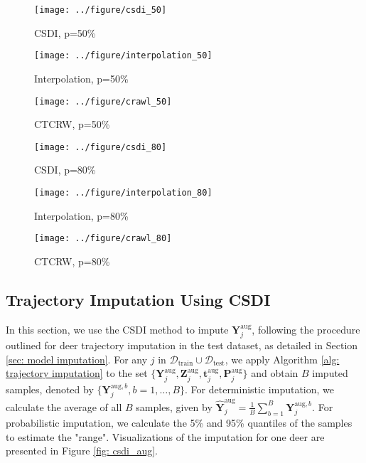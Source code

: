 \documentclass[11pt]{article}
\begin{document}
\begin{figure}[h]
  \centering
  \texttt{[image: ../figure/csdi\_50]} %
  \caption{CSDI, p=50\%}
  \label{fig: csdi_50} %
\end{figure}

\begin{figure}[h]
  \centering
  \texttt{[image: ../figure/interpolation\_50]} %
  \caption{Interpolation, p=50\%}
  \label{fig: interpolation_50} %
\end{figure}

\begin{figure}[h]
  \centering
  \texttt{[image: ../figure/crawl\_50]} %
  \caption{CTCRW, p=50\%}
  \label{fig: ctcrw_50} %
\end{figure}

\begin{figure}[h]
  \centering
  \texttt{[image: ../figure/csdi\_80]} %
  \caption{CSDI, p=80\%}
  \label{fig: csdi_80} %
\end{figure}

\begin{figure}[h]
  \centering
  \texttt{[image: ../figure/interpolation\_80]} %
  \caption{Interpolation, p=80\%}
  \label{fig: interpolation_80} %
\end{figure}

\begin{figure}[h]
  \centering
  \texttt{[image: ../figure/crawl\_80]} %
  \caption{CTCRW, p=80\%}
  \label{fig: ctcrw_80} %
\end{figure}




\subsection{Trajectory Imputation Using CSDI}
In this section, we use the CSDI method to impute $\bm{Y}_j^{\mathrm{aug}}$, following the procedure outlined for deer trajectory imputation in the test dataset, as detailed in Section \ref{sec: model imputation}. For any $j$ in $\mathcal{D}_{\mathrm{train}} \cup \mathcal{D}_{\mathrm{test}}$, we apply Algorithm \ref{alg: trajectory imputation} to the set $\{\bm{Y}_j^{\mathrm{aug}}, \bm{Z}_j^{\mathrm{aug}}, \bm{t}_j^{\mathrm{aug}}, \bm{P}_j^{\mathrm{aug}}\}$ and obtain $B$ imputed samples, denoted by $\{\bm{Y}_j^{\mathrm{aug},b}, b=1,\ldots, B\}$. For deterministic imputation, we calculate the average of all $B$ samples, given by $\hat{\bm{Y}}_j^{\mathrm{aug}} = \frac{1}{B} \sum_{b=1}^B \bm{Y}_j^{\mathrm{aug},b}$. For probabilistic imputation, we calculate the 5\% and 95\% quantiles of the samples to estimate the "range". Visualizations of the imputation for one deer are presented in Figure \ref{fig: csdi_aug}.
\end{document}
